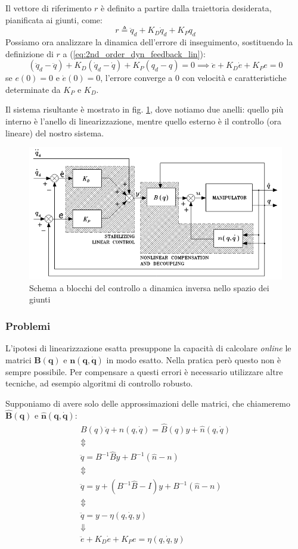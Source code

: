 \boldmath
Il vettore di riferimento $r$ è definito a partire dalla traiettoria desiderata, pianificata ai giunti, come:
$$
r \triangleq \ddot{q}_d + K_D \dot{q}_d + K_P q_d 
$$
Possiamo ora analizzare la dinamica dell'errore di inseguimento, sostituendo la definizione di $r$ a (\ref{eq:2nd_order_dyn_feedback_lin}):
$$
(\ddot{q}_d - \ddot{q}) + K_D(\dot{q}_d - \dot{q}) + K_P(q_d - q) = 0
\implies
\ddot{e} + K_D\dot{e} + K_Pe = 0
$$
se $e(0) = 0$ e $\dot{e}(0) = 0$, l'errore converge a 0 con velocità e caratteristiche determinate da $K_P$ e $K_D$.
\unboldmath

Il sistema risultante è mostrato in fig. \ref{fig:centralizedcontrol2}, dove notiamo due anelli: quello più interno è l'anello di linearizzazione, mentre quello esterno è il controllo (ora lineare) del nostro sistema.

\begin{figure}
	\centering
	\includegraphics[width=0.7\linewidth]{images/centralized_control_2}
	\caption{Schema a blocchi del controllo a dinamica inversa nello spazio dei giunti}
	\label{fig:centralizedcontrol2}
\end{figure}


\vspace{20pt}
\subsubsection{Problemi}
L’ipotesi di linearizzazione esatta presuppone la capacità di calcolare \textit{online} le matrici $\mathbf{B(q)}$ e $\mathbf{n(q, \dot{q})}$ in modo esatto. Nella pratica però questo non è sempre possibile.
Per compensare a questi errori è necessario utilizzare altre tecniche, ad esempio algoritmi di controllo robusto.

Supponiamo di avere solo delle approssimazioni delle matrici, che chiameremo $\mathbf{\hat{B}(q)}$ e $\mathbf{\hat{n}(q, \dot{q})}$:
\boldmath
\begin{gather*}
B(q)\ddot{q} + n(q, \dot{q}) = \hat{B}(q)y + \hat{n}(q, \dot{q}) \\
\Updownarrow \\
\ddot{q} = B^{-1}\hat{B}y + B^{-1}(\hat{n} - n) \\
\Updownarrow \\
\ddot{q} = y + (B^{-1}\hat{B} - I)y + B^{-1}(\hat{n} - n) \\
\Updownarrow \\
\ddot{q} = y - \eta(q, \dot{q}, y) \\
\Downarrow \\
\ddot{e} + K_D\dot{e} + K_Pe = \eta(q, \dot{q}, y)
\end{gather*}

